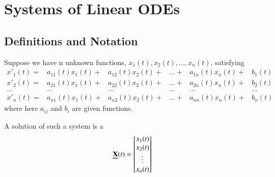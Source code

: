 %
%
%
\chapter{Systems of Linear ODEs}
\label{Syst} %

\section{Definitions and Notation}

\begin{definition}
        Suppose we have n unknown functions, $x_1(t),x_2(t),...,x_n(t)$, satisfying \begin{equation}
                \begin{matrix}
                        x'_1(t)=&a_{11}(t)x_1(t)+&a_{12}(t)x_2(t)+&\hdots+&a_{1n}(t)x_n(t)+&b_1(t) \\
                        x'_2(t)=&a_{21}(t)x_1(t)+&a_{22}(t)x_2(t)+&\hdots+&a_{2n}(t)x_n(t)+&b_2(t) \\
                        \hdots&\hdots&\hdots&\hdots&\hdots&\hdots \\
                        x'_n(t)=&a_{n1}(t)x_1(t)+&a_{n2}(t)x_2(t)+&\hdots+&a_{nn}(t)x_n(t)+&b_n(t) 
                \end{matrix}
        \end{equation}
        where here $a_{ij}$ and $b_{i}$ are given functions.
\end{definition}


\begin{definition}[Solution]
        A solution of such a system is a  \begin{equation}
                \Emph{X}(t) = \begin{bmatrix}x_1(t) \\ x_2(t) \\ \vdots \\ x_n(t) \end{bmatrix}
        \end{equation}
\end{definition}


